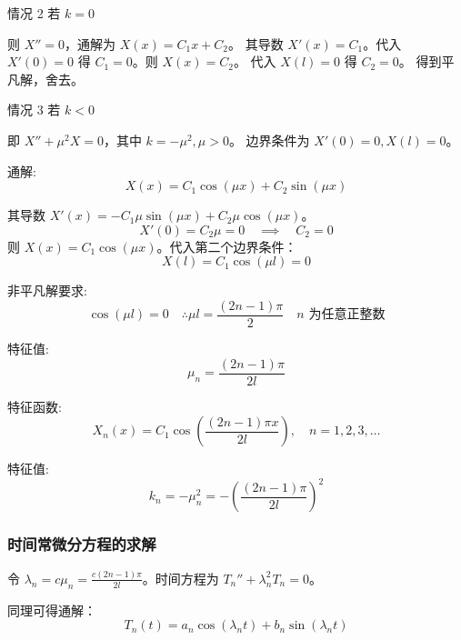 \documentclass[12pt,a4paper]{article}
\numberwithin{subsection}{section}
\numberwithin{subsubsection}{subsection}
\theoremstyle{plain}
\theoremstyle{definition}
\theoremstyle{remark}
\begin{document}
	情况 2 \quad 若 \(k = 0\)
	
	则 \(X'' = 0\)，通解为 $X(x) = C_1 x + C_2$。
	其导数 $X'(x) = C_1$。代入 $X'(0)=0$ 得 $C_1=0$。则 $X(x) = C_2$。
	代入 $X(l)=0$ 得 $C_2=0$。
	得到平凡解，舍去。
	
	情况 3 \quad 若 \(k < 0\)
	
	即 \(X'' + \mu^2 X = 0\)，其中 \(k = -\mu^2, \mu > 0\)。
	边界条件为 $X'(0) = 0, X(l) = 0$。
	
	通解:
	\begin{equation}
		X(x) = C_1 \cos(\mu x) + C_2 \sin(\mu x)
	\end{equation}
	
	其导数 $X'(x) = -C_1 \mu \sin(\mu x) + C_2 \mu \cos(\mu x)$。
	\begin{equation}
		X'(0) = C_2 \mu = 0 \quad \implies \quad C_2 = 0
	\end{equation}
	则 $X(x) = C_1 \cos(\mu x)$。代入第二个边界条件：
	\begin{equation}
		X(l) = C_1 \cos(\mu l) = 0
	\end{equation}
	
	非平凡解要求:
	\begin{equation*}
		\cos(\mu l) = 0 \quad \therefore \mu l = \frac{(2n-1)\pi}{2} \quad n \text{ 为任意正整数}
	\end{equation*}
	
	特征值:
	\begin{equation}
		\mu_n = \frac{(2n-1)\pi}{2l}
	\end{equation}
	
	特征函数:
	\begin{equation}
		X_n(x) = C_1 \cos\left(\frac{(2n-1)\pi x}{2l}\right), \quad n = 1, 2, 3, \ldots
	\end{equation}
	
	特征值:
	\begin{equation}
		k_n = -\mu_n^2 = -\left(\frac{(2n-1)\pi}{2l}\right)^2
	\end{equation}
	
	\subsubsection{时间常微分方程的求解}
	令 $\lambda_n = c \mu_n = \frac{c(2n-1)\pi}{2l}$。时间方程为 $T_n'' + \lambda_n^2 T_n = 0$。
	
	同理可得通解：
	\begin{equation}
		T_n(t) = a_n \cos(\lambda_n t) + b_n \sin(\lambda_n t)
	\end{equation}
	
\end{document}
